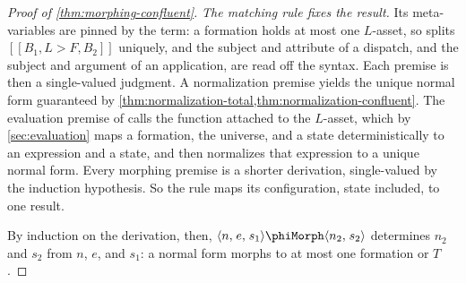 \begin{proof}[Proof of \cref{thm:morphing-confluent}]
\emph{The matching rule fixes the result.}
Its meta-variables are pinned by the term: a formation holds at most one $L$-asset,
  so  splits $[[ B_1, L> F, B_2 ]]$ uniquely, and the subject and
  attribute of a dispatch, and the subject and argument of an application, are read
  off the syntax.
Each premise is then a single-valued judgment.
A normalization premise yields the unique normal form guaranteed by
  \cref{thm:normalization-total,thm:normalization-confluent}.
The evaluation premise of  calls the function attached to the
  $L$-asset, which by \cref{sec:evaluation} maps a formation, the universe, and a
  state deterministically to an expression and a state, and then normalizes that
  expression to a unique normal form.
Every morphing premise is a shorter derivation, single-valued by the induction
  hypothesis.
So the rule maps its configuration, state included, to one result.

By induction on the derivation, then, \(\phinoMorph{n}{e}{s_1}{n_2}{s_2}\)
  determines \(n_2\) and \(s_2\) from \(n\), \(e\), and \(s_1\): a normal form morphs
  to at most one formation or $T$.
\end{proof}
